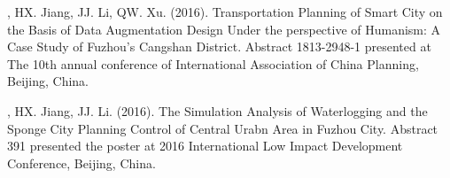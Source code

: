 \begin{etaremune}
\item
    \Shaoqing, HX. Jiang, JJ. Li, QW. Xu. (2016).
    Transportation Planning of Smart City on the Basis of Data Augmentation Design Under the perspective of Humanism: A Case Study of Fuzhou’s Cangshan District.
    Abstract 1813-2948-1 presented at The 10th annual conference of International Association of China Planning, Beijing, China.
\item
    \Shaoqing, HX. Jiang, JJ. Li. (2016).
    The Simulation Analysis of Waterlogging and the Sponge City Planning Control of Central Urabn Area in Fuzhou City.
    Abstract 391 presented the poster at 2016 International Low Impact Development Conference, Beijing, China.
\end{etaremune}
